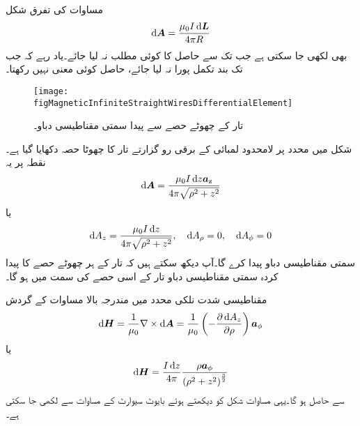 مساوات  کی تفرق شکل
\begin{align}\label{مساوات_مقناطیسی_سمتی_دباو_تفرق_شکل}
\dif \kvec{A}=\frac{\mu_0 I \dif \kvec{L}}{4\pi R}
\end{align}
بھی لکھی جا سکتی ہے جب تک  سے حاصل  کا کوئی مطلب نہ لیا جائے۔یاد رہے کہ جب تک بند تکمل پورا نہ لیا جائے، حاصل  کوئی معنی نہیں رکھتا۔
\begin{figure}
\centering
\texttt{[image: figMagneticInfiniteStraightWiresDifferentialElement]}
\caption{تار کے چھوٹے حصے سے پیدا سمتی مقناطیسی دباو۔}
\label{شکل_مقناطیسی_سمتی_مقناطیسی_دباو_تفرق_حصہ}
\end{figure}

شکل  میں  محدد پر لامحدود لمبائی کے برقی رو گزارتے تار کا چھوٹا حصہ  دکھایا گیا ہے۔نقطہ  پر یہ
\begin{align*}
\dif \kvec{A}=\frac{\mu_0 I \dif z \az}{4\pi \sqrt{\rho^2+z^2}}
\end{align*}
یا
\begin{align}
\dif  A_z=\frac{\mu_0 I \dif z}{4\pi \sqrt{\rho^2+z^2}}, \quad \dif A_\rho=0, \quad \dif A_\phi=0
\end{align}
سمتی مقناطیسی دباو پیدا کرے گا۔آپ دیکھ سکتے ہیں کہ تار کے ہر چھوٹے حصے کا پیدا کردہ سمتی مقناطیسی دباو تار کے اسی حصے کی سمت میں ہو گا۔

مقناطیسی شدت  نلکی محدد میں مندرجہ بالا مساوات کے گردش
\begin{align*}
\dif \kvec{H}=\frac{1}{\mu_0} \nabla \times \dif \kvec{A}=\frac{1}{\mu_0} \left(-\frac{\partial \dif A_z}{\partial \rho} \right)\aphi
\end{align*}
یا
\begin{align*}
\dif \kvec{H}=\frac{I \dif z}{4\pi} \frac{\rho \aphi}{\left(\rho^2+z^2 \right)^{\frac{3}{2}}}
\end{align*}
 سے حاصل ہو گا۔یہی مساوات شکل  کو دیکھتے ہوئے بایوٹ سیوارٹ کے مساوات سے لکھی جا سکتی ہے۔

